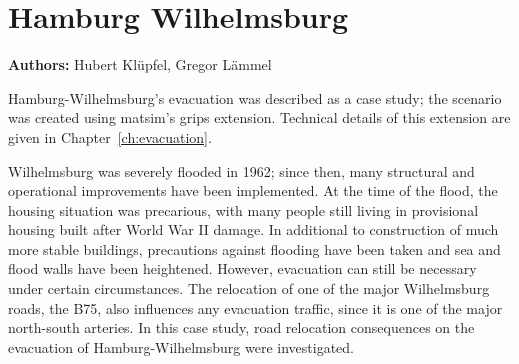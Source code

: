 \chapter{Hamburg Wilhelmsburg}
\label{ch:hhw}
\hfill \textbf{Authors:} Hubert Klüpfel, Gregor Lämmel


Hamburg-Wilhelmsburg's evacuation was described as a case study; the scenario was created using \gls{matsim}'s \gls{grips} \gls{extension}. Technical details of this extension are given in Chapter~\ref{ch:evacuation}. 

Wilhelmsburg was severely flooded in 1962; since then, many structural and operational improvements have been implemented. At the time of the flood, the housing situation was precarious, with many people still living in provisional housing built after World War II damage. In additional to  construction of much more stable buildings, precautions against flooding have been taken and sea and flood walls have been heightened. However, evacuation can still be necessary under certain circumstances. The relocation of one of the major Wilhelmsburg roads, the B75, also influences any evacuation traffic, since it is one of the major north-south arteries. In this case study, road relocation consequences on the evacuation of Hamburg-Wilhelmsburg were investigated.

